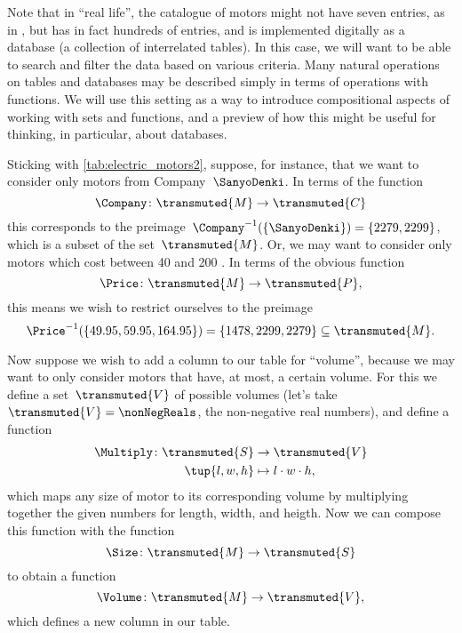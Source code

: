 Note that in ``real life'', the catalogue of motors might not have seven entries, as in \XXX, but has in fact hundreds of entries, and is implemented digitally as a database (a collection of interrelated tables).
In this case, we will want to be able to search and filter the data based on various criteria.
Many natural operations on tables and databases may be described simply in terms of operations with functions.
We will use this setting as a way to introduce compositional aspects of working with sets and functions, and a preview of how this might be useful for thinking, in particular, about databases.

Sticking with \cref{tab:electric_motors2}, suppose, for instance, that we want to consider only motors from Company~$\SanyoDenki$.
In terms of the function
\begin{equation*}
    \Company\colon \transmuted{M} \to \transmuted{C}
\end{equation*}
this corresponds to the preimage~$\Company^{-1}(\{\SanyoDenki \}) = \{2279, 2299\}$, which is a subset of the set~$\transmuted{M}$.
Or, we may want to consider only motors which cost between 40 and 200 \USD.
In terms of the obvious function
\begin{equation*}
    \Price\colon \transmuted{M} \to \transmuted{P},
\end{equation*}
this means we wish to restrict ourselves to the preimage
\begin{equation*}
    \Price^{-1}(\{ 49.95, 59.95, 164.95\}) = \{ 1478, 2299, 2279 \} \subseteq \transmuted{M}.
\end{equation*}

Now suppose we wish to add a column to our table for ``volume'', because we may want to only consider motors that have, at most, a certain volume.
For this we define a set~$\transmuted{V}$ of possible volumes (let's take~$\transmuted{V} = \nonNegReals$, the non-negative real numbers), and define a function
\begin{equation*}
    \begin{aligned}
        \Multiply \colon \transmuted{S} &\to \transmuted{V}\\
        \tup{l, w, h} &\mapsto l \cdot w \cdot h,
    \end{aligned}
\end{equation*}
which maps any size of motor to its corresponding volume by multiplying together the given numbers for length, width, and heigth.
Now we can compose this function with the function
\begin{equation*}
    \Size \colon \transmuted{M} \to \transmuted{S}
\end{equation*}
to obtain a function
\begin{equation*}
    \Volume\colon \transmuted{M} \to \transmuted{V},
\end{equation*}
which defines a new column in our table.


